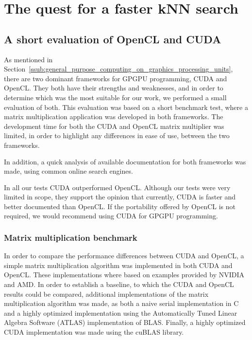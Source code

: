 
\chapter{The quest for a faster kNN search} %
\label{sec:the_quest_for_a_faster_knn_search}


\section{A short evaluation of OpenCL and CUDA} %
\label{sub:a_short_evaluation_of_opencl_and_cuda}

As mentioned in Section~\ref{ssub:general_purpose_computing_on_graphics_processing_units}, there are two dominant frameworks for GPGPU programming, CUDA and OpenCL\@. They both have their strengths and weaknesses, and in order to determine which was the most suitable for our work, we performed a small evaluation of both. This evaluation was based on a short benchmark test, where a matrix multiplication application was developed in both frameworks. The development time for both the CUDA and OpenCL matrix multiplier was limited, in order to highlight any differences in ease of use, between the two frameworks.

In addition, a quick analysis of available documentation for both frameworks was made, using common online search engines.

In all our tests CUDA outperformed OpenCL\@. Although our tests were very limited in scope, they support the opinion that currently, CUDA is faster and better documented than OpenCL\@. If the portability offered by OpenCL is not required, we would recommend using CUDA for GPGPU programming.

\subsection{Matrix multiplication benchmark} %
\label{sub:matrix_multiplication_benchmark}
In order to compare the performance differences between CUDA and OpenCL, a simple matrix multiplication algorithm was implemented in both CUDA and OpenCL\@. These implementations where based on examples provided by NVIDIA and AMD\@. In order to establish a baseline, to which the CUDA and OpenCL results could be compared, additional implementations of the matrix multiplication algorithm was made, as both a naive serial implementation in C and a highly optimized implementation using the Automatically Tuned Linear Algebra Software (ATLAS\cite{atlas}) implementation of BLAS\@. Finally, a highly optimized CUDA implementation was made using the cuBLAS\cite{cublas} library.

